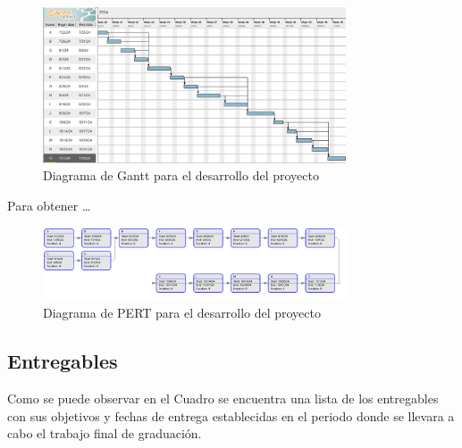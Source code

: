 \documentclass[12pt]{article}
\begin{document}
\begin{figure}[h!]
  \centering
  \includegraphics[width=0.8\textwidth]{diagramas/gantt.png}
  \caption{Diagrama de Gantt para el desarrollo del proyecto}
  \label{fig:gantt}
\end{figure}

Para obtener \dots

\begin{figure}[h!]
  \centering
  \includegraphics[width=0.8\textwidth]{diagramas/pert.png}
  \caption{Diagrama de PERT para el desarrollo del proyecto}
  \label{fig:pert}
\end{figure}

\subsection{Entregables}

Como se puede observar en el Cuadro se encuentra una lista de los entregables con sus objetivos y fechas de entrega establecidas en el periodo donde se llevara a cabo el trabajo final de graduación.
\end{document}
